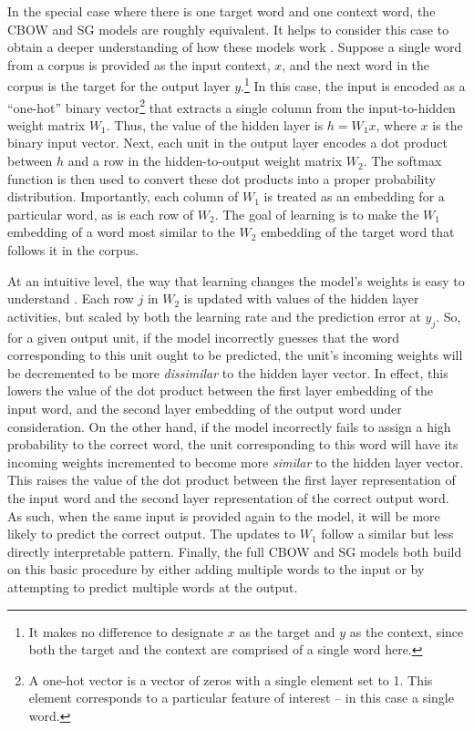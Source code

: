 In the special case where there is one target word and one context word, the CBOW and SG models are roughly equivalent. It helps to consider this case to obtain a deeper understanding of how these models work \citep[see][for further details]{Rong:2014}. Suppose a single word from a corpus is provided as the input context, $x$, and the next word in the corpus is the target for the output layer $y$.\footnote{It makes no difference to designate $x$ as the target and $y$ as the context, since both the target and the context are comprised of a single word here.} In this case, the input is encoded as a ``one-hot'' binary vector\footnote{A one-hot vector is a vector of zeros with a single element set to 1. This element corresponds to a particular feature of interest -- in this case a single word.} that extracts a single column from the input-to-hidden weight matrix $W_1$. Thus, the value of the hidden layer is $h = W_1 x$, where $x$ is the binary input vector. Next, each unit in the output layer encodes a dot product between $h$ and a row in the hidden-to-output weight matrix $W_2$. The softmax function is then used to convert these dot products into a proper probability distribution. Importantly, each column of $W_1$ is treated as an embedding for a particular word, as is each row of $W_2$. The goal of learning is to make the $W_1$ embedding of a word most similar to the $W_2$ embedding of the target word that follows it in the corpus. 

At an intuitive level, the way that learning changes the model's weights is easy to understand \citep{Rong:2014}. Each row $j$ in $W_2$ is updated with values of the hidden layer activities, but scaled by both the learning rate and the prediction error at $y_j$. So, for a given output unit, if the model incorrectly guesses that the word corresponding to this unit ought to be predicted, the unit's incoming weights will be decremented to be more \textit{dissimilar} to the hidden layer vector. In effect, this lowers the value of the dot product between the first layer embedding of the input word, and the second layer embedding of the output word under consideration. On the other hand, if the model incorrectly fails to assign a high probability to the correct word, the unit corresponding to this word will have its incoming weights incremented to become more \textit{similar} to the hidden layer vector. This raises the value of the dot product between the first layer representation of the input word and the second layer representation of the correct output word. As such, when the same input is provided again to the model, it will be more likely to predict the correct output. The updates to $W_1$ follow a similar but less directly interpretable pattern. Finally, the full CBOW and SG models both build on this basic procedure by either adding multiple words to the input or by attempting to predict multiple words at the output. 

